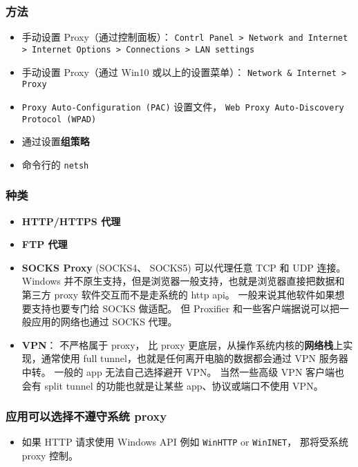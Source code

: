 
\subsubsection{方法}
\begin{itemize}
\item 手动设置 Proxy（通过控制面板）： \verb`Contrl Panel > Network and Internet > Internet Options > Connections > LAN settings`
\item 手动设置 Proxy（通过 Win10 或以上的设置菜单）： \verb`Network & Internet > Proxy`
\item \verb`Proxy Auto-Configuration (PAC)` 设置文件， \verb`Web Proxy Auto-Discovery Protocol (WPAD)`
\item 通过设置\textbf{组策略}
\item 命令行的 \verb`netsh`
\end{itemize}

\subsubsection{种类}
\begin{itemize}
\item \textbf{HTTP/HTTPS 代理}
\item \textbf{FTP 代理}
\item \textbf{SOCKS Proxy} (SOCKS4、 SOCKS5) 可以代理任意 TCP 和 UDP 连接。Windows 并不原生支持，但是浏览器一般支持，也就是浏览器直接把数据和第三方 proxy 软件交互而不是走系统的 http api。 一般来说其他软件如果想要支持也要专门给 SOCKS 做适配。 但 Proxifier 和一些客户端据说可以把一般应用的网络也通过 SOCKS 代理。
\item \textbf{VPN}： 不严格属于 proxy， 比 proxy 更底层，从操作系统内核的\textbf{网络栈}上实现，通常使用 full tunnel，也就是任何离开电脑的数据都会通过 VPN 服务器中转。 一般的 app 无法自己选择避开 VPN。 当然一些高级 VPN 客户端也会有 split tunnel 的功能也就是让某些 app、协议或端口不使用 VPN。
\end{itemize}

\subsubsection{应用可以选择不遵守系统 proxy}
\begin{itemize}
\item 如果 HTTP 请求使用 Windows API 例如 \verb`WinHTTP` or \verb`WinINET`， 那将受系统 proxy 控制。
\end{itemize}
